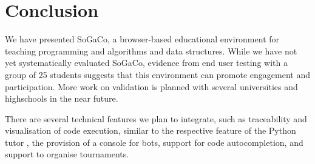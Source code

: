 \section{Conclusion}

We have presented SoGaCo, a browser-based educational environment for teaching programming and algorithms and data structures. While we have not yet systematically evaluated SoGaCo, evidence from end user testing with a group of 25 students suggests that this environment can promote engagement and participation. More work on validation is planned with several universities and highschools in the near future. 

There are several technical features we plan to integrate, such as traceability and visualisation of code execution, similar to the respective feature of the Python tutor \cite{GuoSIGCSE2013}, the provision of a console for bots, support for code autocompletion, and support to organise tournaments. 
